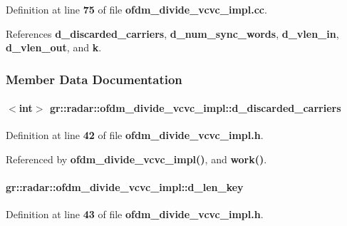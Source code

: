 Definition at line {\bf 75} of file {\bf ofdm\+\_\+divide\+\_\+vcvc\+\_\+impl.\+cc}.



References {\bf d\+\_\+discarded\+\_\+carriers}, {\bf d\+\_\+num\+\_\+sync\+\_\+words}, {\bf d\+\_\+vlen\+\_\+in}, {\bf d\+\_\+vlen\+\_\+out}, and {\bf k}.



\subsubsection{Member Data Documentation}
\paragraph[{d\+\_\+discarded\+\_\+carriers}]{$<${\bf int}$>$ gr\+::radar\+::ofdm\+\_\+divide\+\_\+vcvc\+\_\+impl\+::d\+\_\+discarded\+\_\+carriers}\label{classgr_1_1radar_1_1ofdm__divide__vcvc__impl_afedff5a84749eda17523647d1375a96f}


Definition at line {\bf 42} of file {\bf ofdm\+\_\+divide\+\_\+vcvc\+\_\+impl.\+h}.



Referenced by {\bf ofdm\+\_\+divide\+\_\+vcvc\+\_\+impl()}, and {\bf work()}.

\paragraph[{d\+\_\+len\+\_\+key}]{ gr\+::radar\+::ofdm\+\_\+divide\+\_\+vcvc\+\_\+impl\+::d\+\_\+len\+\_\+key}\label{classgr_1_1radar_1_1ofdm__divide__vcvc__impl_a1ff22cce9af72344951846150e29e2cd}


Definition at line {\bf 43} of file {\bf ofdm\+\_\+divide\+\_\+vcvc\+\_\+impl.\+h}.

